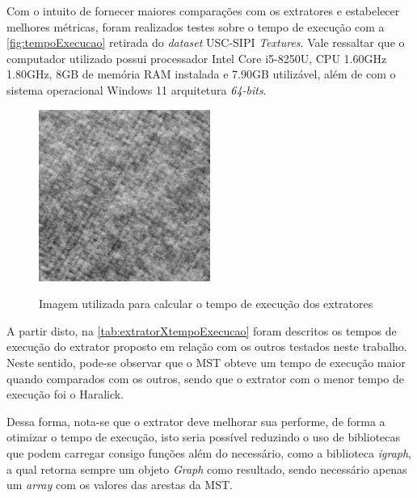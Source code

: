 \par Com o intuito de fornecer maiores comparações com os extratores e estabelecer melhores métricas, foram realizados testes sobre o tempo de execução com a \autoref{fig:tempoExecucao} retirada do \textit{dataset} USC-SIPI \textit{Textures}. Vale ressaltar que o computador utilizado possui processador Intel Core i5-8250U, CPU 1.60GHz 1.80GHz, 8GB de memória RAM instalada e 7.90GB utilizável, além de com o sistema operacional Windows 11 arquitetura \textit{64-bits}.

\pagebreak 

\begin{figure}[!h]
    \centering
    \caption{Imagem utilizada para calcular o tempo de execução dos extratores}
    \includegraphics[width=0.5\textwidth]{./dados/figuras/testeExecucao.png}
    \label{fig:tempoExecucao}
\end{figure}

\par A partir disto, na \autoref{tab:extratorXtempoExecucao} foram descritos os tempos de execução do extrator proposto em relação com os outros testados neste trabalho. Neste sentido, pode-se observar que o MST obteve um tempo de execução maior quando comparados com os outros, sendo que o extrator com o menor tempo de execução foi o Haralick. 



\par Dessa forma, nota-se que o extrator deve melhorar sua performe, de forma a otimizar o tempo de execução, isto seria possível reduzindo o uso de bibliotecas que podem carregar consigo funções além do necessário, como a biblioteca \textit{igraph}, a qual retorna sempre um objeto \textit{Graph} como resultado, sendo necessário apenas um \textit{array} com os valores das arestas da MST.

